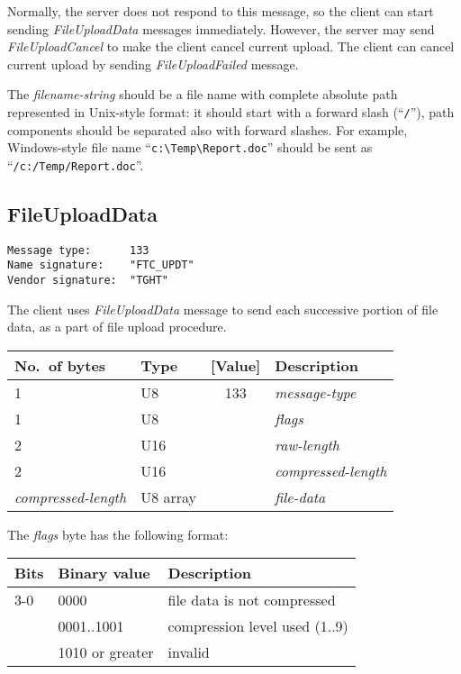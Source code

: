 \documentclass[a4paper]{article}
\newcommand{\typestr}[1]{\textit{#1}}
\begin{document}
Normally, the server does not respond to this message, so the client
can start sending \typestr{FileUploadData} messages immediately.
However, the server may send \typestr{FileUploadCancel} to make the
client cancel current upload. The client can cancel current upload by
sending \typestr{FileUploadFailed} message.

The \typestr{filename-string} should be a file name with complete
absolute path represented in Unix-style format: it should start with a
forward slash (``\verb|/|''), path components should be separated also
with forward slashes. For example, Windows-style file name
``\verb|c:\Temp\Report.doc|'' should be sent as
``\verb|/c:/Temp/Report.doc|''.

\newpage
\subsection{FileUploadData}
\begin{verbatim}
Message type:      133
Name signature:    "FTC_UPDT"
Vendor signature:  "TGHT"
\end{verbatim}

The client uses \typestr{FileUploadData} message to send each
successive portion of file data, as a part of file upload procedure.

\begin{tabular}{l|lc|l} \hline
No.\ of bytes & Type & [Value] & Description \\ \hline
1 & U8  & 133 & \typestr{message-type} \\
1 & U8  &     & \typestr{flags} \\
2 & U16 &     & \typestr{raw-length} \\
2 & U16 &     & \typestr{compressed-length} \\
\typestr{compressed-length} & U8 array & & \typestr{file-data} \\
\hline\end{tabular}

The \typestr{flags} byte has the following format:

\begin{tabular}{l|l|l}
\hline
Bits & Binary value   & Description \\ \hline
3-0 & 0000            & file data is not compressed \\
    & 0001..1001      & compression level used (1..9) \\
    & 1010 or greater & invalid \\
\hline
\end{tabular}
\end{document}
